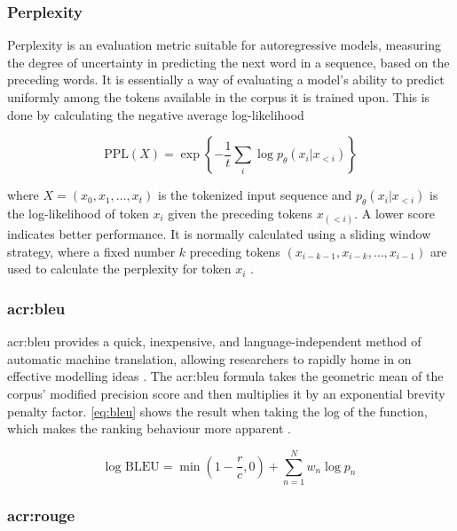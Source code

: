 \subsubsection{Perplexity}

Perplexity is an evaluation metric suitable for autoregressive models, measuring the degree of uncertainty in predicting the next word in a sequence, based on the preceding words. It is essentially a way of evaluating a model's ability to predict uniformly among the tokens available in the corpus it is trained upon. This is done by calculating the negative average log-likelihood

\begin{equation}
    \text{PPL}(X) = \exp \left\{ -\frac{1}{t} \sum_{i} \log p_\theta(x_i | x_{<i}) \right\}
    \label{eq:ppl}
\end{equation}

\noindent where $X = (x_0, x_1, \ldots, x_t)$ is the tokenized input sequence and $p_\theta(x_i | x_{<i})$ is the log-likelihood of token $x_i$ given the preceding tokens $x_(<i)$. A lower score indicates better performance. It is normally calculated using a sliding window strategy, where a fixed number $k$ preceding tokens $(x_{i-k-1},x_{i-k},\ldots,x_{i-1})$ are used to calculate the perplexity for token $x_i$ \citep{huggingfacePerplexityFixedlengthModels}.

\subsubsection[BiLingual Evaluation Understudy]{\acrfull{acr:bleu}}

\gls{acr:bleu} provides a quick, inexpensive, and language-independent method of automatic machine translation, allowing researchers to rapidly home in on effective modelling ideas \citep{papineniBleuMethodAutomatic2002}. The \gls{acr:bleu} formula takes the geometric mean of the corpus' modified precision score and then multiplies it by an exponential brevity penalty factor. \eqref{eq:bleu} shows the result when taking the log of the function, which makes the ranking behaviour more apparent \citep[5]{papineniBleuMethodAutomatic2002}.

\begin{equation}
    \text{log BLEU} = \min\left(1 - \frac{r}{c}, 0\right) + \sum_{n=1}^{N} w_n \log p_n
    \label{eq:bleu}
\end{equation}

\subsubsection[Recall-Oriented Understudy (ROUGE)]{\acrfull{acr:rouge}}

